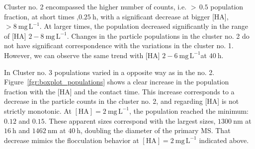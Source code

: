 \documentclass[journal=langd5,manuscript=article]{achemso}
\begin{document}
Cluster no. 2 encompassed the higher number of counts, i.e. $>\,0.5$ population fraction, at short times ,$0.25~\mathrm{h}$, with a significant decrease at bigger [HA], $>8~\mathrm{mg\,L^{-1}}$. At larger times, the population decreased significantly in the range of [HA] $2-8~\mathrm{mg\,L^{-1}}$. Changes in the particle populations in the cluster no. 2 do not have significant correspondence  with the variations in the cluster no. 1. However, we can observe the same trend with [HA] $2-6~\mathrm{mg\,L^{-1}}$at $40~\mathrm{h}$.

In Cluster no. 3 populations varied in a opposite way as in the no. 2. Figure~\ref{fgr:boxplot_populations} shows a clear increase in the population fraction with the [HA] and the contact time. This increase corresponds to a decrease in the particle counts in the cluster no. 2, and regarding [HA] is not strictly monotonic. At $\mathrm{[HA]} = 2~\mathrm{mg\,L^{-1}}$, the  population reached the  minimum: $0.12$  and $0.15$. These apparent sizes correspond with the largest sizes, $1300~\mathrm{nm}$ at $16~\mathrm{h}$ and $1462~\mathrm{nm}$ at $40~\mathrm{h}$, doubling the diameter of the primary MS. That decrease mimics the flocculation behavior at $\mathrm{[HA]} = 2~\mathrm{mg\,L^{-1}}$ indicated above.
\end{document}

